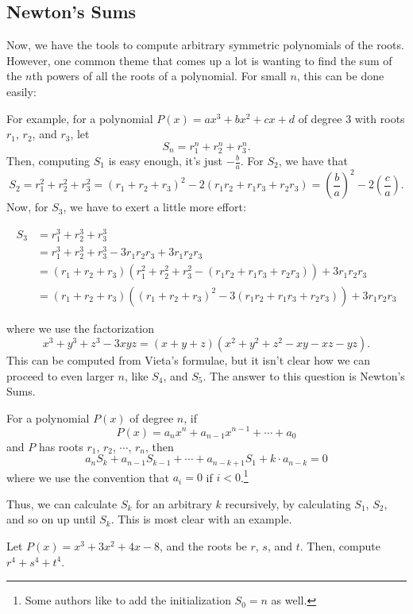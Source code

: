 \documentclass[11pt]{scrartcl}
\begin{document}
\subsection{Newton's Sums}

Now, we have the tools to compute arbitrary symmetric polynomials of the roots. However, one common theme that comes up a lot is wanting to find the sum of the $n$th powers of all the roots of a polynomial. For small $n$, this can be done easily:

For example, for a polynomial $P(x) = ax^3+bx^2+cx+d$ of degree $3$ with roots $r_1$, $r_2$, and $r_3$, let \[S_n = r_1^n+r_2^n+r_3^n.\] Then, computing $S_1$ is easy enough, it's just $-\tfrac{b}{a}$. For $S_2$, we have that \[S_2 = r_1^2+r_2^2+r_3^2 = (r_1+r_2+r_3)^2-2(r_1r_2+r_1r_3+r_2r_3) = \left(\dfrac{b}{a}\right)^2-2\left(\dfrac{c}{a}\right).\] Now, for $S_3$, we have to exert a little more effort:

\begin{align*}
S_3 &= r_1^3+r_2^3+r_3^3 \\
&= r_1^3+r_2^3+r_3^3-3r_1r_2r_3+3r_1r_2r_3 \\
&= (r_1+r_2+r_3)(r_1^2+r_2^2+r_3^2-(r_1r_2+r_1r_3+r_2r_3))+3r_1r_2r_3 \\
&= (r_1+r_2+r_3)((r_1+r_2+r_3)^2-3(r_1r_2+r_1r_3+r_2r_3))+3r_1r_2r_3
\end{align*}

where we use the factorization \[x^3+y^3+z^3-3xyz = (x+y+z)(x^2+y^2+z^2-xy-xz-yz).\] This can be computed from Vieta's formulae, but it isn't clear how we can proceed to even larger $n$, like $S_4$, and $S_5$. The answer to this question is Newton's Sums.

\begin{theorem*}
For a polynomial $P(x)$ of degree $n$, if \[P(x) = a_nx^n+a_{n-1}x^{n-1}+\cdots+a_0\] and $P$ has roots $r_1$, $r_2$, $\cdots$, $r_n$, then \[a_nS_k+a_{n-1}S_{k-1}+\cdots+a_{n-k+1}S_1+k\cdot a_{n-k} = 0\] where we use the convention that $a_i = 0$ if $i < 0$.\footnote{Some authors like to add the initialization $S_0 = n$ as well.}
\end{theorem*}

Thus, we can calculate $S_k$ for an arbitrary $k$ recursively, by calculating $S_1$, $S_2$, and so on up until $S_k$. This is most clear with an example.

\begin{example*}
Let $P(x) = x^3+3x^2+4x-8$, and the roots be $r$, $s$, and $t$. Then, compute $r^4+s^4+t^4$.
\end{example*}
\end{document}
